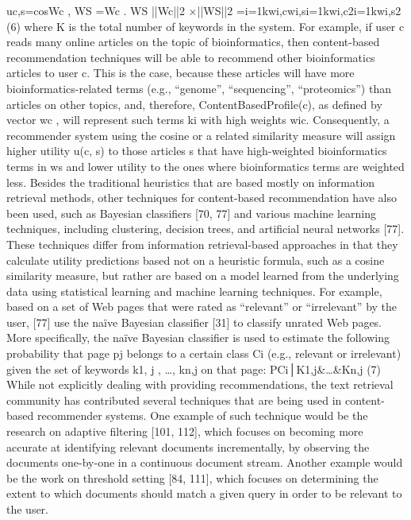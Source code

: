 uc,s=cosWc , WS =Wc . WS ||Wc||2 ×||WS||2 =i=1kwi,cwi,si=1kwi,c2i=1kwi,s2         (6)
where K is the total number of keywords in the system.
For example, if user c reads many online articles on the topic of bioinformatics, then content-based recommendation techniques will be able to recommend other bioinformatics articles to user c. This is the case, because these articles will have more bioinformatics-related terms (e.g., “genome”, “sequencing”, “proteomics”) than articles on other topics,  and, therefore, ContentBasedProfile(c), as defined by vector wc , will represent such terms ki with high weights wic. Consequently, a recommender system using the cosine or a related similarity measure will assign higher utility u(c, s) to those articles s that have high-weighted bioinformatics terms in ws and lower utility to the ones where bioinformatics terms are weighted less.
Besides the traditional heuristics that are based mostly on information retrieval methods, other techniques for content-based recommendation have also been used, such as Bayesian classifiers [70, 77] and various machine learning techniques, including clustering, decision trees, and artificial neural networks [77]. These techniques differ from information retrieval-based approaches in that they calculate utility predictions based not on a heuristic formula,  such as a cosine similarity measure, but rather are based on a model learned from the underlying data using statistical learning and machine learning techniques. For example, based on a set of Web pages that were rated as “relevant” or “irrelevant” by the user, [77] use the naïve Bayesian classifier [31] to classify unrated Web pages. More specifically, the naïve Bayesian classifier is used to estimate the following probability that page pj belongs to a certain class Ci (e.g., relevant or irrelevant) given the set of keywords k1, j , …, kn,j on that page:
PCi│K1,j&…&Kn,j                 (7)
While not explicitly dealing with providing recommendations, the text retrieval community has contributed several techniques that are being used in content-based recommender systems. One example of such technique would be the research on adaptive filtering [101, 112], which focuses on becoming more accurate at identifying relevant documents incrementally, by observing the documents one-by-one in a continuous document stream. Another example would be the work on threshold setting [84, 111], which focuses on determining the extent to which documents should match a given query in order to be relevant to the user.

